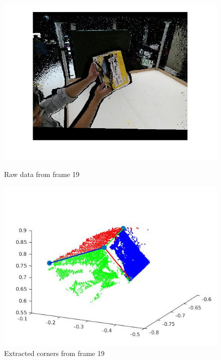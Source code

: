 \documentclass[10pt,a4paper]{article}
\begin{document}
\vspace{-10pt}
\hspace{-40pt}
\begin{figure}[!h]
	\begin{minipage}[t]{0.3 \linewidth}
		
		\centering
		\includegraphics[scale=0.2]{cornerori.jpg}
		\caption{ \small Raw data from frame 19}
		\label{fig:41}
	\end{minipage}
	\begin{minipage}[t]{0.74 \linewidth}
		\centering
		\includegraphics[scale=0.5]{corner.jpg}
		\caption{ \small Extracted corners from frame 19}
		\label{fig:42}
	\end{minipage}
\end{figure}
\end{document}
